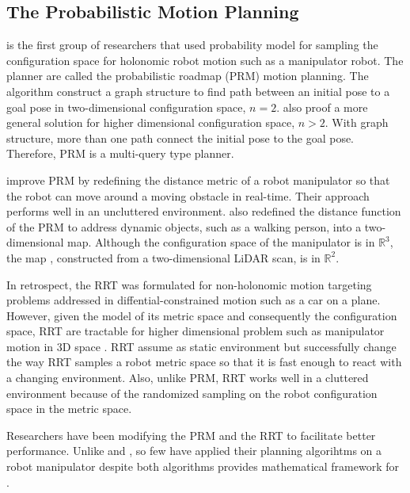 \documentclass[a4paper, 10pt]{article}
\numberwithin{equation}{section} %
\begin{document}
\subsection{The Probabilistic Motion Planning}
\textcite{Kavraki1996} is the first group of researchers 
that used probability model for sampling 
the configuration space for holonomic robot motion 
such as a manipulator robot. The planner are called 
the probabilistic roadmap (PRM) motion planning. The algorithm
construct a graph structure 
to find path between an initial pose to a goal pose in
two-dimensional configuration space, $n=2$. \textcite{Kavraki1996} also
proof a more general solution for higher dimensional configuration space,
$n>2$. With graph structure,
more than one path connect the initial pose to the goal pose. Therefore, PRM is a 
multi-query type planner. 

\textcite{Kunz2010a} improve PRM by redefining the distance metric 
of a robot manipulator so that the robot can move
around a moving obstacle in real-time.
Their approach performs well in an uncluttered environment. 
\textcite{Kunz2010a} also redefined 
the distance function of the PRM to address dynamic objects, such as
a walking person, into a two-dimensional map. Although the 
configuration space of the manipulator is in $\mathbb{R}^3$, the map
, constructed from a two-dimensional LiDAR scan, is in $\mathbb{R}^2$.

In retrospect, the RRT was formulated for 
non-holonomic motion \parencite{LaValle1998} targeting
problems addressed in diffential-constrained motion such
as a car on a plane. However, given the model of its metric space
and consequently the configuration space, RRT are tractable
for higher dimensional problem such as manipulator motion in 
3D space \parencite{Wei2018}. RRT assume as static
environment but \textcite{Wei2018} successfully 
change the way RRT samples a robot metric space so that
it is fast enough to react with a changing environment. Also, unlike PRM,
RRT works well in a cluttered environment because of 
the randomized sampling on the robot configuration space in 
the metric space. 

Researchers have been modifying the PRM 
\parencite{Klasing2007,Likhachev2005,Jaillet2004, Pomarlan2013a} 
and the RRT
\parencite{Otte2015,Ferguson2007,Ferguson2006,Bekris2007} to facilitate
better performance. 
Unlike \textcite{Kunz2010a} and \textcite{Wei2018}, so few have applied their planning
algorihtms on a robot manipulator despite both algorithms
provides mathematical framework for .
\end{document}
